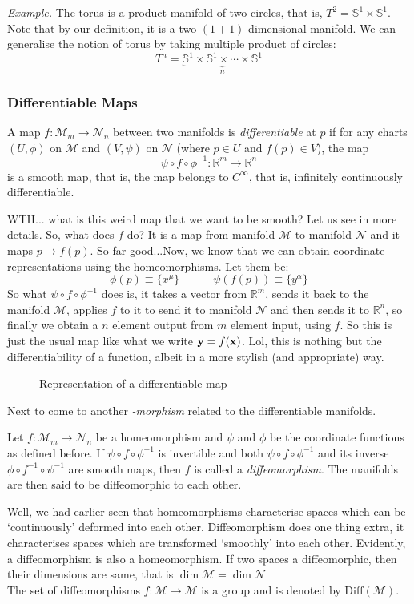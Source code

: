 \textit{Example.} The torus is a product manifold of two circles, that is, $T^2 = \mathbb{S}^1\times \mathbb{S}^1$. Note that by our definition, it is a two $(1+1)$ dimensional manifold. We can generalise the notion of torus by taking multiple product of circles: $$T^n = \underbrace{\mathbb{S}^1\times \mathbb{S}^1\times \cdots \times \mathbb{S}^1}_n$$ 
\subsubsection{Differentiable Maps}
\begin{definition}
  A map $f: \mathcal{M}_m \to \mathcal{N}_n$ between two manifolds is \textit{differentiable} at $p$ if for any charts $(U,\phi)$ on $\mathcal{M}$ and $(V,\psi)$ on $\mathcal{N}$ (where $p\in U$ and $f(p)\in V$), the map $$\psi \circ f \circ \phi^{-1}: \mathbb{R}^m \rightarrow \mathbb{R}^n$$
  is a smooth map, that is, the map belongs to $C^\infty$, that is, infinitely continuously differentiable. 
\end{definition}
WTH... what is this weird map that we want to be smooth? Let us see in more details. So, what does $f$ do? It is a map from manifold $\mathcal{M}$ to manifold $\mathcal{N}$ and it maps $p \mapsto f(p)$. So far good...Now, we know that we can obtain coordinate representations using the homeomorphisms. Let them be:
$$\phi(p) \equiv \{x^\mu\}\quad\quad\quad \psi(f(p)) \equiv \{y^\alpha\}$$
So what $\psi \circ f \circ \phi^{-1}$ does is, it takes a vector from $\mathbb{R}^m$, sends it back to the manifold $\mathcal{M}$, applies $f$ to it to send it to manifold $\mathcal{N}$ and then sends it to $\mathbb{R}^n$, so finally we obtain a $n$ element output from $m$ element input, using $f$. So this is just the usual map like what we write $\boldsymbol{\mathbf{y}} = f(\boldsymbol{\mathbf{x}})$. Lol, this is nothing but the differentiability of a function, albeit in a more stylish (and appropriate) way.
\begin{figure}[H]
  \centering 
  
  \caption{Representation of a differentiable map}
\end{figure}
\noindent
Next to come to another \textit{-morphism} related to the differentiable manifolds. 
\begin{definition}[Diffeomorphism]
  Let $f: \mathcal{M}_m \rightarrow \mathcal{N}_n$ be a homeomorphism and $\psi$ and $\phi$ be the coordinate functions as defined before. If $\psi\circ f\circ\phi^{-1}$ is invertible and both $\psi\circ f\circ\phi^{-1}$ and its inverse $\phi\circ f^{-1}\circ\psi^{-1}$ are smooth maps, then $f$ is called a \textit{diffeomorphism}. The manifolds are then said to be diffeomorphic to each other.
\end{definition}
Well, we had earlier seen that homeomorphisms characterise spaces which can be `continuously' deformed into each other. Diffeomorphism does one thing extra, it characterises spaces which are transformed `smoothly' into each other. Evidently, a diffeomorphism is also a homeomorphism. If two spaces a diffeomorphic, then their dimensions are same, that is $\dim \mathcal{M} = \dim \mathcal{N}$\\[0.3cm]
The set of diffeomorphisms $f:\mathcal{M}\rightarrow\mathcal{M}$ is a group and is denoted by $\mathrm{Diff}(\mathcal{M})$. 
